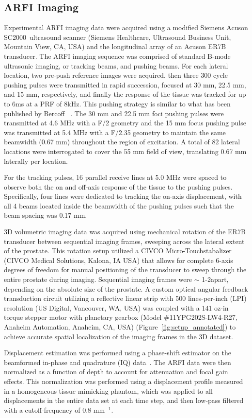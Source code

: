 \subsection{ARFI Imaging}
Experimental ARFI imaging data were acquired using a modified Siemens Acuson
SC2000\texttrademark~ultrasound scanner (Siemens Healthcare, Ultrasound Business Unit,
Mountain View, CA, USA) and the longitudinal array of an Acuson ER7B
transducer.  The ARFI imaging sequence was comprised of
standard B-mode ultrasonic imaging, or tracking beams, and pushing beams. For
each lateral location, two pre-push reference images were acquired, then three
300 cycle pushing pulses were transmitted in rapid succession, focused at 30
mm, 22.5 mm, and 15 mm, respectively, and finally the response of the tissue
was tracked for up to 6ms at a PRF of 8kHz. This pushing strategy is similar to
what has been published by Bercoff \etal~\cite{Bercoff2004}. The 30 mm and 22.5
mm foci pushing pulses were transmitted at 4.6 MHz with a F/2 geometry and the
15 mm focus pushing pulse was transmitted at 5.4 MHz with a F/2.35 geometry to
maintain the same beamwidth (0.67 mm) throughout the region of excitation. A
total of 82 lateral locations were interrogated to cover the 55 mm field of
view, translating 0.67 mm laterally per location.

For the tracking pulses, 16 parallel receive lines at 5.0 MHz were spaced to
observe both the on and off-axis response of the tissue to the pushing pulses.
Specifically, four lines were dedicated to tracking the on-axis displacement,
with all 4 beams located inside the beamwidth of the pushing pulses such that
the beam spacing was 0.17 mm. 

3D volumetric imaging data was acquired using mechanical rotation of the ER7B
transducer between sequential imaging frames, sweeping across the lateral
extent of the prostate.  This rotation setup utilized a CIVCO
Micro-Touch\texttrademark stabalizer (CIVCO Medical Solutions, Kalona, IA USA)
that allows for complete 6-axis degrees of freedom for manual positioning of
the transducer to sweep through the entire prostate during imaging.  Sequential
imaging frames were $\sim$ 1-2\degree apart, depending on the absolute size of the
prostate.  A custom optical angular feedback transduction circuit utilizing a
reflective linear strip with 500 lines-per-inch (LPI) resolution (US Digital,
Vancouver, WA, USA) was coupled with a 141 oz-in torque stepper motor with
planetary gearbox (Model \#11YPG202S-LW4-R27, Anaheim Automation, Anaheim, CA,
USA) (Figure~\ref{fig:setup_annotated}) to achieve accurate spatial
localization of the imaging frames in the 3D dataset.



Displacement estimation was performed using a phase-shift estimator on the
beamformed in-phase and quadrature (IQ) data~\cite{Loupas95,pinton06}. The ARFI
data were then normalized as a function of depth to account for attenuation and
focal gain effects.  This normalization was performed using a displacement
profile measured in a homogeneous tissue-mimicking phantom, which was applied
to all displacements in the entire data set at each time step, and then
low-pass filtered with a cutoff-frequency of 0.8 mm$^{-1}$.
